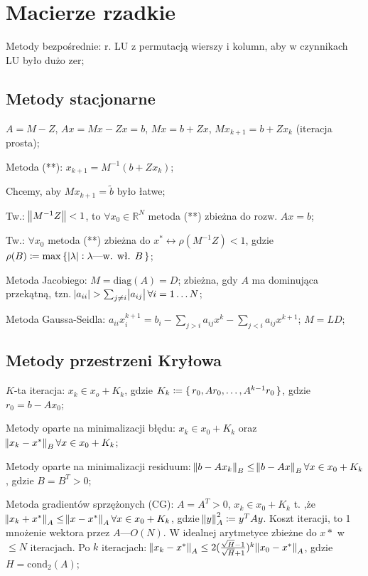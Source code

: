 \section{Macierze rzadkie}

\entry
Metody bezpośrednie: r. LU z permutacją wierszy i kolumn, aby w czynnikach LU było dużo zer;


\subsection{Metody stacjonarne}

\entry
$A=M-Z$, $Ax=Mx-Zx=b$, $Mx=b+Zx$, $Mx_{k+1}=b+Zx_{k}$ (iteracja prosta);

\entry
Metoda (**): $x_{k+1}=M^{-1}(b+Zx_k)$;

\entry
Chcemy, aby $Mx_{k+1}=\tilde{b}$ było łatwe;

\entry
Tw.: $\norm{M^{-1}Z} < 1$, to $\forall x_0 \in \mathbb{R}^N$ metoda (**) zbieżna do rozw. $Ax=b$;

\entry
Tw.: $\forall x_0$ metoda (**) zbieżna do $x^* \leftrightarrow \rho(M^{-1}Z) < 1$, gdzie $\rho(B) \coloneqq \max\set{\abs{\lambda} : \lambda\text{---w. wł. } B}$;

\entry
Metoda Jacobiego: $M=\mathrm{diag}(A) = D$; zbieżna, gdy $A$ ma dominująca przekątną, tzn. $\abs{a_{ii}} > \sum_{j\neq i}\abs{a_{ij}} \forall i=1\ldots N$;

\entry
Metoda Gaussa-Seidla: $a_{ii}x_i^{k+1}=b_i-\sum_{j>i}a_{ij}x^k-\sum_{j<i}a_{ij}x^{k+1}$; $M = LD$;

\subsection{Metody przestrzeni Kryłowa}

\entry
$K$-ta iteracja: $x_k\in x_o+K_k$, gdzie $K_k\coloneqq \set{r_0, Ar_0,\ldots, A^{k-1}r_0}$, gdzie $r_0=b-Ax_0$;

\entry
Metody oparte na minimalizacji błędu: $x_k\in x_0 +K_k$ oraz $\norm{x_k - x^*}_B \forall x\in x_0 + K_k$;

\entry
Metody oparte na minimalizacji residuum: $\norm{b-Ax_k}_B \leq \norm{b-Ax}_B \forall x\in x_0 +K_k$, gdzie $B=B^T>0$;

\entry
Metoda gradientów sprzężonych (CG): $A=A^T>0$, $x_k\in x_0 + K_k$ t. ,że $\norm{x_k+x^*}_A\leq \norm{x-x^*}_A \forall x\in x_0 + K_k$, gdzie $\norm{y}^2_A \coloneqq y^TAy$. Koszt iteracji, to 1 mnożenie wektora przez $A$---$O(N)$. W idealnej arytmetyce zbieżne do $x*$ w $\leq N$ iteracjach. Po $k$ iteracjach: $\norm{x_k - x^*}_A\leq 2(\frac{\sqrt{H} - 1}{\sqrt{H} + 1})^k\norm{x_0-x^*}_A$, gdzie $H=\mathrm{cond}_2(A)$;

